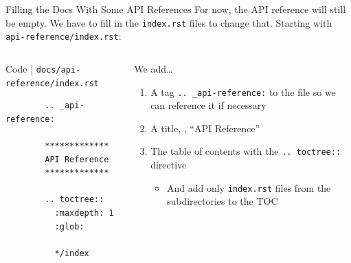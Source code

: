 \begin{frame}[fragile]{Filling the Docs With Some API References}
  For now, the API reference will still be empty. We have to fill in
  the \texttt{index.rst} files to change that. Starting with
  \texttt{api-reference/index.rst}:\\[1em]

  \begin{columns}[onlytextwidth]
    \begin{column}{0.38\textwidth}
      \begin{block}{Code | \texttt{docs/api-reference/index.rst}}
      \begin{verbatim}
        .. _api-reference:

        *************
        API Reference
        *************

        .. toctree::
          :maxdepth: 1
          :glob:

          */index
      \end{verbatim}
      \end{block}
    \end{column}
    \hfill
    \begin{column}{0.58\textwidth}
      We add\dots
      \begin{enumerate}
        \setlength{\itemsep}{1.5em}
        \item A tag \texttt{.. \_api-reference:} to the file so we can reference it if necessary
        \item A title, \eg, \enquote{API Reference}
        \item The table of contents with the \texttt{.. toctree::} directive
          \begin{itemize}
            \item And add only \texttt{index.rst} files from the subdirectories to the TOC
          \end{itemize}
      \end{enumerate}
    \end{column}
  \end{columns}
\end{frame}

